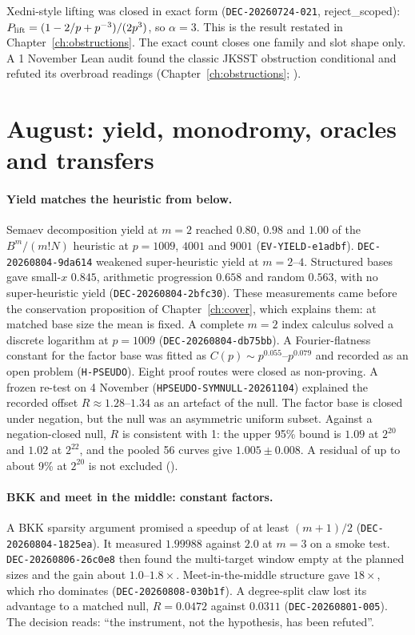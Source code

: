 Xedni-style lifting was closed in exact form (\texttt{DEC-20260724-021},
reject\_scoped): $P_{\rm lift}=(1-2/p+p^{-3})/(2p^3)$, so $\alpha=3$. This
is the result restated in Chapter~\ref{ch:obstructions}. The exact count
closes one family and slot shape only. A 1 November Lean audit found the
classic JKSST obstruction conditional and refuted its overbroad readings
(Chapter~\ref{ch:obstructions}; ).

\section{August: yield, monodromy, oracles and transfers}

\paragraph{Yield matches the heuristic from below.} Semaev decomposition
yield at $m=2$ reached $0.80$, $0.98$ and $1.00$ of the $B^m/(m!N)$
heuristic at $p=1009$, $4001$ and $9001$ (\texttt{EV-YIELD-e1adbf}).
\texttt{DEC-20260804-9da614} weakened super-heuristic yield at $m=2$--$4$.
Structured bases gave small-$x$ $0.845$, arithmetic progression $0.658$
and random $0.563$, with no super-heuristic yield
(\texttt{DEC-20260804-2bfc30}). These measurements came before the
conservation proposition of Chapter~\ref{ch:cover}, which explains them: at
matched base size the mean is fixed. A complete $m=2$ index calculus solved
a discrete logarithm at $p=1009$ (\texttt{DEC-20260804-db75bb}). A
Fourier-flatness constant for the factor base was fitted as
$C(p)\sim p^{0.055}$--$p^{0.079}$ and recorded as an open problem
(\texttt{H-PSEUDO}). Eight proof routes were closed as non-proving. A frozen
re-test on 4 November (\texttt{HPSEUDO-SYMNULL-20261104}) explained the
recorded offset $R\approx1.28$--$1.34$ as an artefact of the null. The
factor base is closed under negation, but the null was an asymmetric
uniform subset. Against a negation-closed null, $R$ is consistent with 1:
the upper 95\% bound is $1.09$ at $2^{20}$ and $1.02$ at $2^{22}$, and the
pooled 56 curves give $1.005\pm0.008$. A residual of up to about 9\% at
$2^{20}$ is not excluded
().

\paragraph{BKK and meet in the middle: constant factors.} A BKK sparsity
argument promised a speedup of at least $(m+1)/2$
(\texttt{DEC-20260804-1825ea}). It measured $1.99988$ against $2.0$ at
$m=3$ on a smoke test. \texttt{DEC-20260806-26c0e8} then found the
multi-target window empty at the planned sizes and the gain about
$1.0$--$1.8\times$. Meet-in-the-middle structure gave $18\times$, which rho
dominates (\texttt{DEC-20260808-030b1f}). A degree-split claw lost its
advantage to a matched null, $R=0.0472$ against $0.0311$
(\texttt{DEC-20260801-005}). The decision reads: ``the instrument, not the
hypothesis, has been refuted''.

